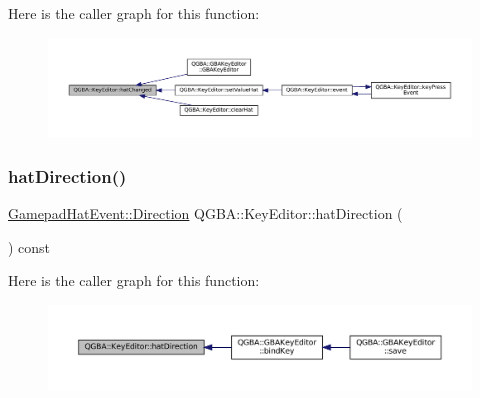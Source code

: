 Here is the caller graph for this function\+:
\nopagebreak
\begin{figure}[H]
\begin{center}
\leavevmode
\includegraphics[width=350pt]{class_q_g_b_a_1_1_key_editor_a1fe06073809c20b103d4a670343ecde1_icgraph}
\end{center}
\end{figure}
\mbox{\label{class_q_g_b_a_1_1_key_editor_a16ba1d9604e684e86b4e5ef6c8a00599}} 
\subsubsection{\texorpdfstring{hat\+Direction()}{hatDirection()}}
{\footnotesize\ttfamily \mbox{\hyperlink{class_q_g_b_a_1_1_gamepad_hat_event_ae3f20662c61b054e5344aafb9d843837}{Gamepad\+Hat\+Event\+::\+Direction}} Q\+G\+B\+A\+::\+Key\+Editor\+::hat\+Direction (\begin{DoxyParamCaption}{ }\end{DoxyParamCaption}) const\hspace{0.3cm}{\ttfamily [inline]}}

Here is the caller graph for this function\+:
\nopagebreak
\begin{figure}[H]
\begin{center}
\leavevmode
\includegraphics[width=350pt]{class_q_g_b_a_1_1_key_editor_a16ba1d9604e684e86b4e5ef6c8a00599_icgraph}
\end{center}
\end{figure}
\mbox{\label{class_q_g_b_a_1_1_key_editor_a3caf519db651b7658f6c3d589a7ed482}} 
